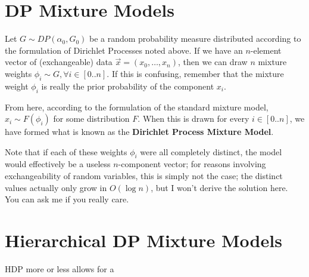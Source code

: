\documentclass[11pt]{article}
\begin{document}
\section{DP Mixture Models}

Let $G \sim DP(\alpha_0, G_0)$ be a random probability measure distributed according to the formulation of Dirichlet Processes noted above. If we have an $n$-element vector of (exchangeable) data $\vec{x} = (x_0, \ldots, x_n)$, then we can draw $n$ mixture weights $\phi_i \sim G, \forall i \in [0..n]$. If this is confusing, remember that the mixture weight $\phi_i$ is really the prior probability of the component $x_i$.

From here, according to the formulation of the standard mixture model, $x_i \sim F(\phi_i)$ for some distribution $F$. When this is drawn for every $i \in [0..n]$, we have formed what is known as the \textbf{Dirichlet Process Mixture Model}.

Note that if each of these weights $\phi_i$ were all completely distinct, the model would effectively be a useless $n$-component vector; for reasons involving exchangeability of random variables, this is simply not the case; the distinct values actually only grow in $O(\log n)$, but I won't derive the solution here. You can ask me if you really care.

\section{Hierarchical DP Mixture Models}

HDP more or less allows for a 

\pagebreak

\nocite{*}

\begin{spacing}{1}
  
  
\end{spacing}
\end{document}
